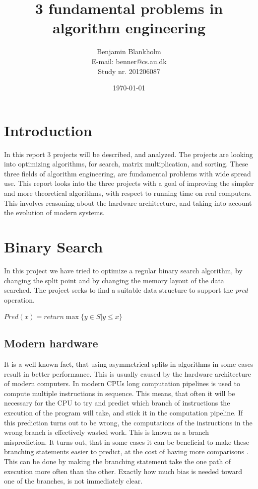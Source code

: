\documentclass{article}
\title{3 fundamental problems in algorithm engineering}
\author{Benjamin Blankholm \\
		E-mail: benner@cs.au.dk \\
		Study nr. 201206087}
\date{\today}
\begin{document}
\maketitle
\newpage

\listoffigures

\section{Introduction}
In this report 3 projects will be described, and analyzed. The projects are looking into optimizing algorithms, for search, matrix multiplication, and sorting. These three fields of algorithm engineering, are fundamental problems with wide spread use.
This report looks into the three projects with a goal of improving the simpler and more theoretical algorithms, with respect to running time on real computers. This involves reasoning about the hardware architecture, and taking into account the evolution of modern systems. 

\section{Binary Search}
In this project we have tried to optimize a regular binary search algorithm, by changing the split point and by changing the memory layout of the data searched. The project seeks to find a suitable data structure to support the \textit{pred} operation. 
\begin{center}
$Pred(x) = return \max \{ y \in S | y \leq x \}$	
\end{center}

\subsection{Modern hardware}
\label{sec:modern_hardware}
It is a well known fact, that using asymmetrical splits in algorithms in some cases result in better performance. \cite{brodal-bst, Kaligosi-quicksort}
This is usually caused by the hardware architecture of modern computers. In modern CPUs long computation pipelines is used to compute multiple instructions in sequence. This means, that often it will be necessary for the CPU to try and predict which branch of instructions the execution of the program will take, and stick it in the computation pipeline. If this prediction turns out to be wrong, the computations of the instructions in the wrong branch is effectively wasted work. This is known as a branch misprediction. It turns out, that in some cases it can be beneficial to make these branching statements easier to predict, at the cost of having more comparisons \cite{brodal-branch}. This can be done by making the branching statement take the one path of execution more often than the other. Exactly how much bias is needed toward one of the branches, is not immediately clear.
\end{document}
